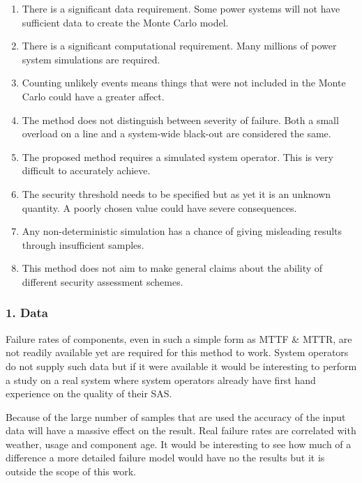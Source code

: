 \documentclass[a4paper,oneside,12pt]{report}
\begin{document}
\begin{enumerate}
\item There is a significant data requirement. Some power systems will not have sufficient data to create the Monte Carlo model.
\item There is a significant computational requirement. Many millions of power system simulations are required.
\item Counting unlikely events means things that were not included in the Monte Carlo could have a greater affect.
\item The method does not distinguish between severity of failure. Both a small overload on a line and a system-wide black-out are considered the same.
\item The proposed method requires a simulated system operator. This is very difficult to accurately achieve.
\item The security threshold needs to be specified but as yet it is an unknown quantity. A poorly chosen value could have severe consequences.
\item Any non-deterministic simulation has a chance of giving misleading results through insufficient samples.
\item This method does not aim to make general claims about the ability of different security assessment schemes.
\end{enumerate}

\subsubsection{1. Data}
Failure rates of components, even in such a simple form as MTTF \& MTTR, are not readily available yet are required for this method to work. System operators do not supply such data but if it were available it would be interesting to perform a study on a real system where system operators already have first hand experience on the quality of their SAS.

Because of the large number of samples that are used the accuracy of the input data will have a massive effect on the result. Real failure rates are correlated with weather, usage and component age. It would be interesting to see  how much of a difference a more detailed failure model would have no the results but it is outside the scope of this work.
\end{document}
